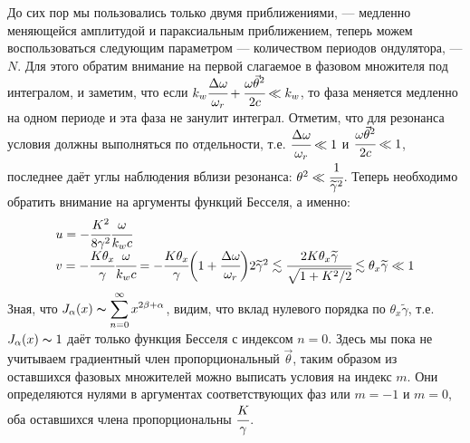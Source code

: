 \documentclass[14pt,a4paper]{extarticle}
\numberwithin{equation}{section}
\begin{document}
До сих пор мы пользовались только двумя приближениями, --- медленно меняющейся амплитудой и параксиальным приближением, теперь можем воспользоваться следующим параметром --- количеством периодов ондулятора, --- $N$. Для этого обратим внимание на первой слагаемое в фазовом множителя под интегралом, и заметим, что если $k_w \cfrac{\Delta\omega}{\omega_r} + 
\cfrac{\omega\vec{\theta}^2}{2c} \ll k_w$, то фаза меняется медленно на одном периоде и эта фаза не занулит интеграл. Отметим, что для резонанса условия должны выполняться по отдельности, т.е. $\cfrac{\Delta\omega}{\omega_r} \ll 1$ и $\cfrac{\omega\vec{\theta}^2}{2c} \ll 1$, последнее даёт углы наблюдения вблизи резонанса: $\theta^2 \ll \cfrac{1}{\widetilde{\gamma}^2}$. Теперь необходимо обратить внимание на аргументы функций Бесселя, а именно: 
\begin{equation}
	\begin{array}{lcl}
		u = -\cfrac{K^2}{8\gamma^2}\cfrac{\omega}{k_w c}\\
		v = -\cfrac{K{\theta_x}}{\gamma}\cfrac{\omega}{k_w c} = - \cfrac{K{\theta_x}}{\gamma}
		\bigg(1 + \cfrac{\Delta\omega}{\omega_r}\bigg)2\widetilde{\gamma}^2 \lesssim
		\cfrac{2K{\theta_x}\widetilde{\gamma}}{\sqrt{1 + K^2/2}} \lesssim \theta_x\widetilde{\gamma} \ll 1
	\end{array}	
\end{equation}
Зная, что $J_\alpha(x) \thicksim \displaystyle\sum\limits_{n =0}^{\infty} x^{2\beta + \alpha} $, видим, что вклад нулевого порядка по $\theta_x\widetilde{\gamma}$, т.е. $J_\alpha(x) \thicksim 1$ даёт только функция Бесселя с индексом $n = 0$. Здесь мы пока не учитываем градиентный член пропорциональный $\vec{\theta}$, таким образом из оставшихся фазовых множителей можно выписать условия на индекс $m$. Они определяются нулями в аргументах соответствующих фаз или $m = -1$ и $m = 0$, оба оставшихся члена пропорциональны $\cfrac{K}{\gamma}$. 
\end{document}
